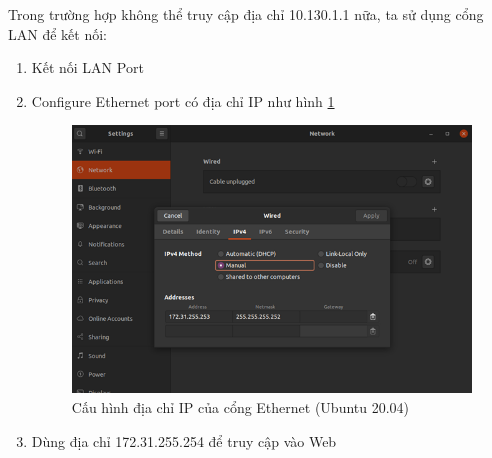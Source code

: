 Trong trường hợp không thể truy cập địa chỉ 10.130.1.1 nữa, ta sử dụng cổng LAN để kết nối:
\begin{enumerate}
    \item Kết nối LAN Port
    \item Configure Ethernet port có địa chỉ IP như hình \ref{fig:config_ethernet}
    \begin{figure}[H]
        \includegraphics[width=\textwidth]{images/Quanh/Config_ethernet.png}
        \caption{Cấu hình địa chỉ IP của cổng Ethernet (Ubuntu 20.04)}
        \label{fig:config_ethernet}
    \end{figure}
    \item Dùng địa chỉ 172.31.255.254 để truy cập vào Web
\end{enumerate}



